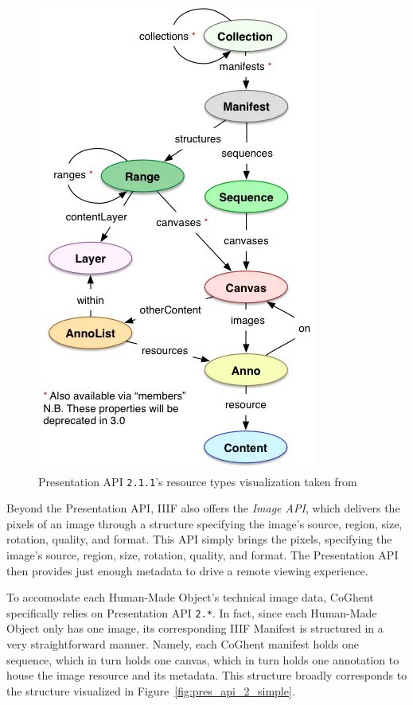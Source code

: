 \begin{figure}[htbp]
    \centering
	\includegraphics[height=0.6\textheight]{images/pres_api_2.jpg}
	\caption{Presentation API \texttt{2.1.1}'s resource types visualization taken from \citet{appleby2017presentation}}
	\label{fig:pres_api_2}
\end{figure}

Beyond the Presentation API, IIIF also offers the \textit{Image API}, which delivers the pixels of an image through a structure specifying the image's source, region, size, rotation, quality, and format. This API simply brings the pixels, specifying the image's source, region, size, rotation, quality, and format. The Presentation API then provides just enough metadata to drive a remote viewing experience. \citep{emanuel2018stitching}

To accomodate each Human-Made Object's technical image data, CoGhent specifically relies on Presentation API \texttt{2.*}. In fact, since each Human-Made Object only has one image, its corresponding IIIF Manifest is structured in a very straightforward manner. Namely, each CoGhent manifest holds one sequence, which in turn holds one canvas, which in turn holds one annotation to house the image resource and its metadata. This structure broadly corresponds to the structure visualized in Figure~\ref{fig:pres_api_2_simple}. \citep{floreverk2022coghent}

